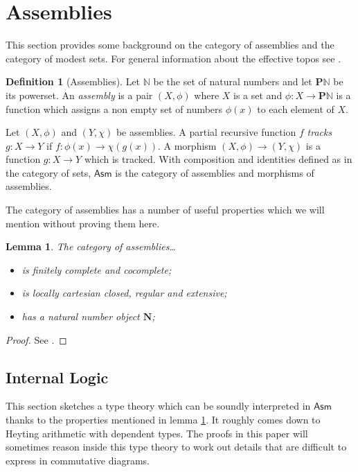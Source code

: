 \documentclass{amsart}
\theoremstyle{plain}
\newtheorem{lemma}[theorem]{Lemma}
\theoremstyle{definition}
\newtheorem{defin}[theorem]{Definition}
\newcommand\N{\mathbb N}
\newcommand\pow{\mathbf P}
\newcommand\Asm{\mathsf{Asm}}
\begin{document}
\section{Assemblies}
This section provides some background on the category of assemblies and the category of modest sets. For general information about the effective topos see \cite{MR2479466}.

\begin{defin}[Assemblies] Let $\N$ be the set of natural numbers and let $\pow\N$ be its powerset.
An \emph{assembly} is a pair $(X,\phi)$ where $X$ is a set and $\phi:X\to \pow \N$ is a function which assigns a non empty set of numbers $\phi(x)$ to each element of $X$.

Let $(X,\phi)$ and $(Y,\chi)$ be assemblies. A partial recursive function $f$ \emph{tracks} $g:X\to Y$ if $f: \phi(x) \to \chi(g(x))$. A morphism $(X,\phi)\to (Y,\chi)$ is a function $g:X\to Y$ which is tracked. With composition and identities defined as in the category of sets, $\Asm$ is the category of assemblies and morphisms of assemblies.
\end{defin}

The category of assemblies has a number of useful properties which we will mention without proving them here.

\newcommand\nno{\mathbf N}
\begin{lemma} The category of assemblies\dots
\begin{itemize}
\item is finitely complete and cocomplete;
\item is locally cartesian closed, regular and extensive;
\item has a natural number object $\nno$;
\end{itemize}\label{essential_properties}%
\end{lemma}

\begin{proof} See \cite{MR2479466,MSC:8896618,RealCats}. \end{proof}

\subsection{Internal Logic}\label{internal}
This section sketches a type theory which can be soundly interpreted in $\Asm$ thanks to the properties mentioned in lemma \ref{essential_properties}. It roughly comes down to Heyting arithmetic with dependent types. The proofs in this paper will sometimes reason inside this type theory to work out details that are difficult to express in commutative diagrams. 
\end{document}
